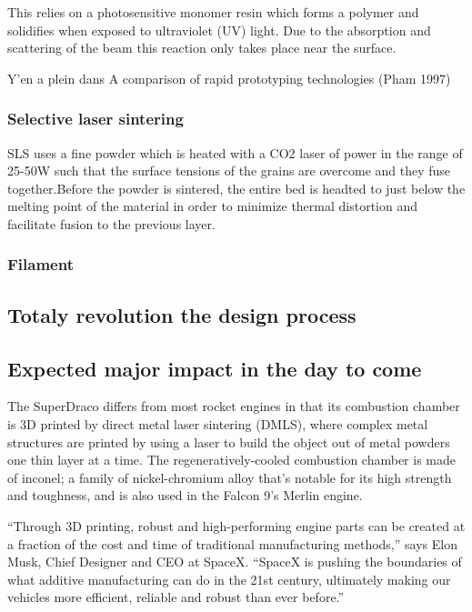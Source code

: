 This relies on a photosensitive monomer resin which forms a polymer and solidifies when exposed to ultraviolet (UV) light.
Due to the absorption and scattering of the beam this reaction only takes place near the surface.

Y'en a plein dans A comparison of rapid prototyping technologies (Pham 1997)

\subsubsection{Selective laser sintering} %
SLS uses a fine powder which is heated with a CO2 laser of power in the range of 25-50W such that the surface tensions of the grains are overcome and they fuse together.Before the powder is sintered, the entire bed is headted to just below the melting point of the material in order to minimize thermal distortion and facilitate fusion to the previous layer.

\subsubsection{Filament} %

\subsection{Totaly revolution the design process} %

\subsection{Expected major impact in the day to come} %

The SuperDraco differs from most rocket engines in that its combustion chamber is 3D printed by direct metal laser sintering (DMLS), where complex metal structures are printed by using a laser to build the object out of metal powders one thin layer at a time. The regeneratively-cooled combustion chamber is made of inconel; a family of nickel-chromium alloy that’s notable for its high strength and toughness, and is also used in the Falcon 9’s Merlin engine.

“Through 3D printing, robust and high-performing engine parts can be created at a fraction of the cost and time of traditional manufacturing methods,” says Elon Musk, Chief Designer and CEO at SpaceX. “SpaceX is pushing the boundaries of what additive manufacturing can do in the 21st century, ultimately making our vehicles more efficient, reliable and robust than ever before.”

